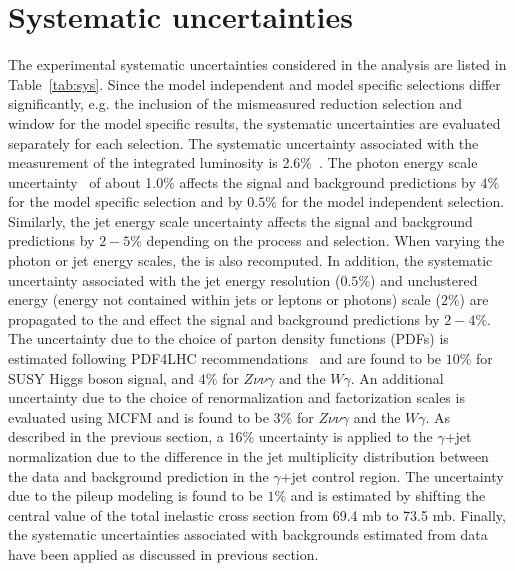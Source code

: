 \section{Systematic uncertainties}

The experimental systematic uncertainties considered in the analysis are listed in Table~\ref{tab:sys}. Since the model independent and model specific selections differ significantly, e.g. the inclusion of the mismeasured \met reduction selection and \etg window for the model specific results, the systematic uncertainties are evaluated separately for each selection. The systematic uncertainty associated with the measurement of the integrated luminosity is 2.6$\%$~\cite{CMS:2013gfa}. The photon energy scale uncertainty~\cite{2014photon} of about 1.0$\%$ affects the signal and background predictions by $4\%$ for the model specific selection and by $0.5\%$ for the model independent selection.  Similarly, the jet energy scale uncertainty affects the signal and background predictions by $2-5\%$ depending on the process and selection.  When varying the photon or jet energy scales, the \met is also recomputed. In addition, the systematic uncertainty associated with the jet energy resolution ($0.5\%$) and unclustered energy (energy not contained within jets or leptons or photons) scale ($2\%$) are propagated to the \met and effect the signal and background predictions by $2-4\%$. The uncertainty due to the choice of parton density functions (PDFs) is estimated following PDF4LHC recommendations~\cite{PDF4LHC,PDF4LHC1,MSTW08LO} and are found to be $10\%$ for SUSY Higgs boson signal, and $4\%$ for $Z\nu\nu\gamma$ and the $W\gamma$. An additional uncertainty due to the choice of renormalization and factorization scales is evaluated using MCFM and is found to be $3\%$ for $Z\nu\nu\gamma$ and the $W\gamma$. As described in the previous section, a $16\%$ uncertainty is applied to the $\gamma$+jet normalization due to the difference in the jet multiplicity distribution between the data and background prediction in the  $\gamma$+jet control region. The uncertainty due to the pileup modeling is found to be $1\%$ and is estimated by shifting the central value of the total inelastic cross section from 69.4 mb to 73.5 mb. Finally, the systematic uncertainties associated with backgrounds estimated from data have been applied as discussed in previous section. 


